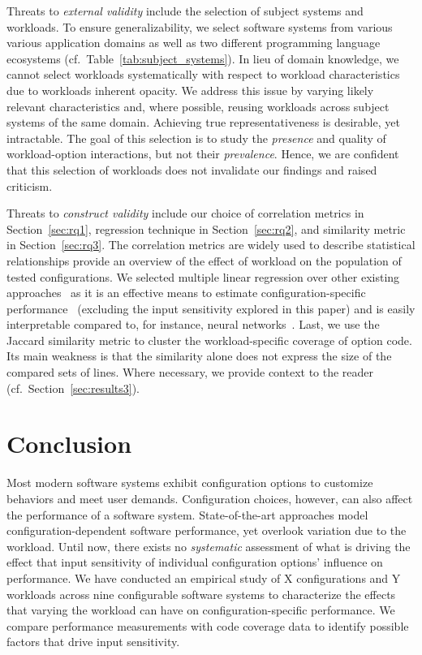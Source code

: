 {{{Threats to\textit{ external validity} include the selection of subject systems and workloads. To ensure generalizability, we select software systems from various various application domains as well as two different programming language ecosystems (cf.~Table~\ref{tab:subject_systems}). In lieu of domain knowledge, we cannot select workloads systematically with respect to workload characteristics due to workloads inherent opacity. We address this issue by varying likely relevant characteristics and, where possible, reusing workloads across subject systems of the same domain. Achieving true representativeness is desirable, yet intractable. 
The goal of this selection is to study the \emph{presence} and quality of workload-option interactions, but not their \emph{prevalence}. Hence, we are confident that this selection of workloads does not invalidate our findings and raised criticism.

Threats to \textit{construct validity} include our choice of correlation metrics in Section~\ref{sec:rq1}, regression technique in Section~\ref{sec:rq2}, and similarity metric in Section~\ref{sec:rq3}. The correlation metrics are widely used to describe statistical relationships provide an overview of the effect of workload on the population of tested configurations. We selected multiple linear regression over other existing approaches~\cite{dorn2020,haDeepPerf2019,perfAL,guoVariabilityawarePerformancePrediction2013,sarkarCostEfficientSamplingPerformance,guo_2018_data,fourier_learning_2015,perLasso,chen_hinnperf_2022} as it is an effective means to estimate configuration-specific performance~\cite{siegmundPerformanceinfluenceModelsHighly2015} (excluding the input sensitivity explored in this paper) and is easily interpretable compared to, for instance, neural networks~\cite{haDeepPerf2019,perfAL,chen_hinnperf_2022}. Last, we use the Jaccard similarity metric to cluster the workload-specific coverage of option code. Its main weakness is that the similarity alone does not express the size of the compared sets of lines. Where necessary, we provide context to the reader (cf.~Section~\ref{sec:results3}). 
	

\section{Conclusion}\label{sec:conclusion}
\color{black}
Most modern software systems exhibit configuration options to customize behaviors and meet user demands. Configuration choices, however, can also affect the performance of a software system.
State-of-the-art approaches model configuration-dependent software performance, yet overlook variation due to the workload. Until now, there exists no \textit{systematic} assessment of what is driving the effect that input sensitivity of individual configuration options’ influence on performance. We have conducted an empirical study of {\color{red}X configurations and Y workloads across nine} configurable software systems to characterize the effects that varying the workload can have on configuration-specific performance. We compare performance measurements with code coverage data to identify possible factors that drive input sensitivity. 

}}}
